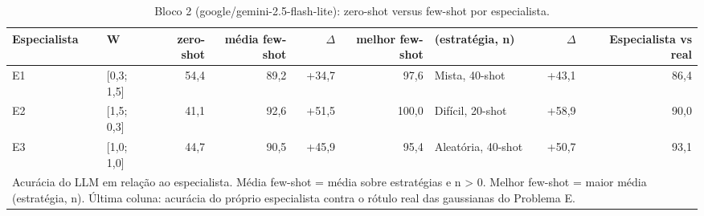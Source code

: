 \begin{table}[htbp]
\centering
\small
\caption{Bloco 2 (google/gemini-2.5-flash-lite): zero-shot versus few-shot por especialista.}
\label{tab:bloco2_E_zero_vs_fewshot_por_especialista_flashlite}
\begin{tabular}{llrrrrlrr}
\toprule
Especialista & W & zero-shot & média few-shot & $\Delta$ & melhor few-shot & (estratégia, n) & $\Delta$ & Especialista vs real \\
\midrule
E1 & [0,3; 1,5] & 54,4 & 89,2 & +34,7 & 97,6 & Mista, 40-shot & +43,1 & 86,4 \\
E2 & [1,5; 0,3] & 41,1 & 92,6 & +51,5 & 100,0 & Difícil, 20-shot & +58,9 & 90,0 \\
E3 & [1,0; 1,0] & 44,7 & 90,5 & +45,9 & 95,4 & Aleatória, 40-shot & +50,7 & 93,1 \\
\bottomrule
\multicolumn{9}{p{0.95\linewidth}}{\footnotesize Acurácia do LLM em relação ao especialista. Média few-shot = média sobre estratégias e n > 0. Melhor few-shot = maior média (estratégia, n). Última coluna: acurácia do próprio especialista contra o rótulo real das gaussianas do Problema E.} \\
\end{tabular}
\end{table}
